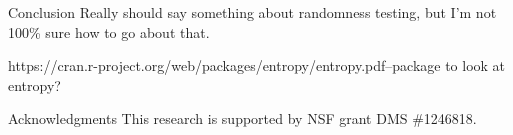 \documentclass[final]{beamer}
\begin{document}
\begin{frame}{}
\begin{columns}[t]
\begin{column}{.32 \linewidth}
\begin{block}{\large Conclusion}
{\color{red} Really should say something about randomness testing, but I'm not 100\% sure how to go about that.}

https://cran.r-project.org/web/packages/entropy/entropy.pdf--package to look at entropy?

\end{block}


	
	  \begin{block}{Acknowledgments}
This research is supported by NSF grant DMS \#1246818.
	 \end{block}



        \end{column}

    \end{columns}

  \end{frame}
\end{document}
